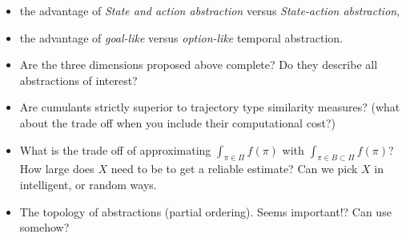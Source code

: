 \begin{itemize}
  \tightlist
  \item the advantage of \textit{State and action abstraction} versus \textit{State-action abstraction},
  \item the advantage of \textit{goal-like} versus \textit{option-like} temporal abstraction.
  \item Are the three dimensions proposed above complete? Do they describe all abstractions of interest?
  \item Are cumulants strictly superior to trajectory type similarity measures? (what about the trade off when you include their computational cost?)
  \item What is the trade off of approximating $\int_{\pi \in \Pi}f(\pi)$ with $\int_{\pi \in B \subset \Pi}f(\pi)$?
  How large does $X$ need to be to get a reliable estimate? Can we pick $X$ in intelligent, or random ways.
  \item The topology of abstractions (partial ordering). Seems important!? Can use somehow?
\end{itemize}
